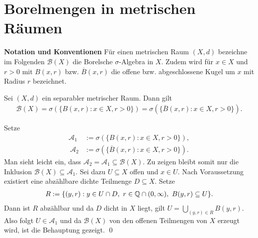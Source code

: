 \section{Borelmengen in metrischen Räumen}
\textbf{Notation und Konventionen}\newline 
Für einen metrischen Raum $(X,d)$ bezeichne im Folgenden $\mathcal{B}(X)$ die Borelsche $\sigma$-Algebra in $X$. 
Zudem wird für $x \in X$ und $r>0$ mit $B(x, r)$ bzw. $\overline{B}(x,r)$ die offene bzw. abgeschlossene Kugel um $x$ mit Radius $r$ bezeichnet.
\begin{proposition}
    Sei $(X,d)$ ein separabler metrischer Raum. Dann gilt
    \begin{align*}
        \mathcal{B}(X) = \sigma(\{B(x,r): x \in X, r > 0 \}) = \sigma(\{\overline{B}(x,r): x \in X, r > 0 \}). 
    \end{align*}
\end{proposition}
\begin{proof*}
    Setze 
    \begin{align*}
        \mathcal{A}_1 &:= \sigma(\{B(x,r): x \in X, r > 0 \}), \\\ 
        \mathcal{A}_2 &:= \sigma(\{\overline{B}(x,r): x \in X, r > 0 \}). 
    \end{align*}
    Man sieht leicht ein, dass $\mathcal{A}_2 = \mathcal{A}_1 \subseteq \mathcal{B}(X)$. Zu zeigen bleibt somit nur die Inklusion $\mathcal{B}(X) \subseteq \mathcal{A}_1$.
    Sei dazu $U \subseteq X$ offen und $x \in U$. Nach Voraussetzung existiert eine abzählbare dichte Teilmenge $D \subseteq X$. Setze  
    \begin{align*}
        R := \{(y,r) : y \in U \cap D, \ r \in \mathbb{Q} \cap (0, \infty), \  B(y,r) \subseteq U \}.
    \end{align*}
    Dann ist $R$ abzählbar und da $D$ dicht in $X$ liegt, gilt $U = \bigcup_{(y,r) \in R}B(y,r)$. 
    Also folgt $U \in \mathcal{A}_1$ und da $\mathcal{B}(X)$ von den offenen Teilmengen von $X$ erzeugt wird, ist die Behauptung gezeigt. \qed
\end{proof*}


